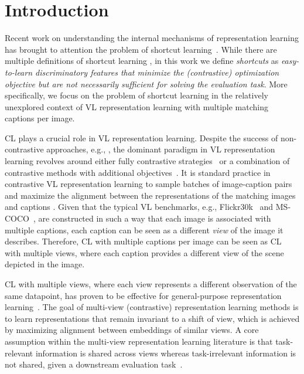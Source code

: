 
\section{Introduction}
\label{sec:introduction}


Recent work on understanding the internal mechanisms of representation learning has brought to attention the problem of shortcut learning~\citep{robinson2021can, chen2021intriguing, scimeca2022which}.
While there are multiple definitions of shortcut learning \citep[e.g., ][]{geirhos2020shortcut, wiles_2022_afinegrained}, in this work we define \emph{shortcuts} as \emph{easy-to-learn discriminatory features that minimize the (contrastive) optimization objective but are not necessarily sufficient for solving the evaluation task}. 
More specifically, we focus on the problem of shortcut learning in the relatively unexplored context of \ac{VL} representation learning with multiple matching captions per image.

\Ac{CL} plays a crucial role in \ac{VL} representation learning. 
Despite the success of non-contrastive approaches, e.g., \citep{bardes2022vicreg}, the dominant paradigm in \ac{VL} representation learning revolves around either fully contrastive strategies~\citep{faghri2018improving, li2019visual, jia2021scaling, radford2021learning} or a combination of contrastive methods with additional objectives~\citep{li2021align, zeng2022multi, li2022blip, zeng2022multi, li2023blip}.
It is standard practice in contrastive \ac{VL} representation learning to sample batches of image-caption pairs and maximize the alignment between the representations of the matching images and captions \citep{radford2019language, jia2021scaling}. 
Given that the typical \ac{VL} benchmarks, e.g., \acl{Flickr30k}~\citep{young2014image} and \acl{MS-COCO}~\citep{lin2014microsoft, chen2015microsoft}, are constructed in such a way that each image is associated with multiple captions, each caption can be seen as a different \textit{view} of the image it describes. 
Therefore, \ac{CL} with multiple captions per image can be seen as \ac{CL} with multiple views, where each caption provides a different view of the scene depicted in the image.

\Ac{CL} with multiple views, where each view represents a different observation of the same datapoint, has proven to be effective for general-purpose representation learning~\citep{hjelm2019learning, chen2020simple, tian2020contrastive}.
The goal of multi-view (contrastive) representation learning methods is to learn representations that remain invariant to a shift of view, which is achieved by maximizing alignment between embeddings of similar views. 
A core assumption within the multi-view representation learning literature is that task-relevant information is shared across views whereas task-irrelevant information is not shared, given a downstream evaluation task~\citep{zhao2017multi, federici2020learning, tian2020contrastive, shwartz2023compress}.

